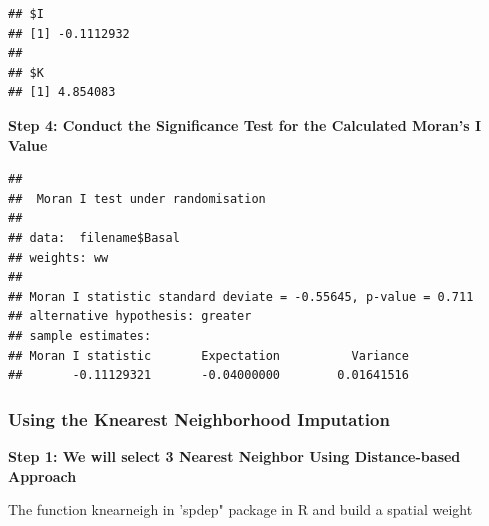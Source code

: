 \documentclass[
]{book}
\newenvironment{Shaded}{\begin{snugshade}}{\end{snugshade}}
\newcommand{\AttributeTok}[1]{\textcolor[rgb]{0.77,0.63,0.00}{#1}}
\newcommand{\CommentTok}[1]{\textcolor[rgb]{0.56,0.35,0.01}{\textit{#1}}}
\newcommand{\DecValTok}[1]{\textcolor[rgb]{0.00,0.00,0.81}{#1}}
\newcommand{\FunctionTok}[1]{\textcolor[rgb]{0.00,0.00,0.00}{#1}}
\newcommand{\NormalTok}[1]{#1}
\newcommand{\OtherTok}[1]{\textcolor[rgb]{0.56,0.35,0.01}{#1}}
\newcommand{\SpecialCharTok}[1]{\textcolor[rgb]{0.00,0.00,0.00}{#1}}
\newcommand{\StringTok}[1]{\textcolor[rgb]{0.31,0.60,0.02}{#1}}
\begin{document}
\begin{verbatim}
## $I
## [1] -0.1112932
## 
## $K
## [1] 4.854083
\end{verbatim}

\textbf{Step 4: Conduct the Significance Test for the Calculated Moran's I Value}

\begin{Shaded}
\end{Shaded}

\begin{verbatim}
## 
##  Moran I test under randomisation
## 
## data:  filename$Basal  
## weights: ww    
## 
## Moran I statistic standard deviate = -0.55645, p-value = 0.711
## alternative hypothesis: greater
## sample estimates:
## Moran I statistic       Expectation          Variance 
##       -0.11129321       -0.04000000        0.01641516
\end{verbatim}

\hypertarget{using-the-knearest-neighborhood-imputation}{%
\subsubsection*{Using the Knearest Neighborhood Imputation}\label{using-the-knearest-neighborhood-imputation}}

\textbf{Step 1: We will select 3 Nearest Neighbor Using Distance-based Approach}

The function knearneigh in 'spdep" package in R and build a spatial weight

\begin{Shaded}
\end{Shaded}
\end{document}
